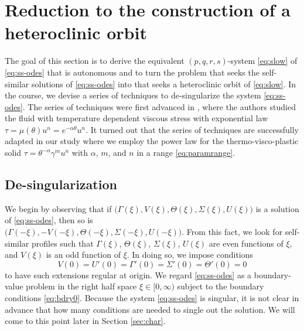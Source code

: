 \documentclass[a4paper,11pt]{article}
\theoremstyle{remark}
\begin{document}
\section{Reduction to the construction of a heteroclinic orbit} \label{sec:formulation}
The goal of this section is to derive the equivalent $(p,q,r,s)$-system \eqref{eq:slow} of \eqref{eq:ss-odes} that is autonomous and to turn the problem that seeks the self-similar solutions of \eqref{eq:ss-odes} into that seeks a heteroclinic orbit of \eqref{eq:slow}. In the course, we devise a series of techniques to de-singularize the system \eqref{eq:ss-odes}. The series of techniques were first advanced in \cite{KOT14}, where the authors studied the fluid with temperature dependent viscous stress with exponential law $ \tau = \mu(\theta)u^n = e^{-\alpha\theta} u^n.$
It turned out that the series of techniques are successfully adapted in our study where we employ the power law for the thermo-visco-plastic solid %
$ \tau = \theta^{-\alpha}\gamma^{m}u^n$ with $\alpha$, $m$, and $n$ in a range \eqref{eq:paramrange}.%

\subsection{De-singularization}
We begin by observing that if $\big(\Gamma(\xi), V(\xi), \Theta(\xi), \Sigma(\xi), U(\xi)\big)$ is a solution of \eqref{eq:ss-odes}, then so is \\$\big(\Gamma(-\xi), -V(-\xi), \Theta(-\xi), \Sigma(-\xi), U(-\xi)\big)$. From this fact, we look for self-similar profiles such that $\Gamma(\xi)$, $\Theta(\xi)$, $\Sigma(\xi)$, $U(\xi)$ are even functions of $\xi$, and $V(\xi)$ is an odd function of $\xi$. In doing so, we impose conditions
\begin{equation}
 V(0)=U'(0)=\Gamma'(0)=\Sigma'(0)=\Theta'(0)=0 \label{eq:bdry0}
\end{equation}
to have such extensions regular at origin. We regard \eqref{eq:ss-odes} as a boundary-value problem in the right half space $\xi \in [0,\infty)$ subject to the boundary conditions \eqref{eq:bdry0}. Because the system \eqref{eq:ss-odes} is singular, it is not clear in advance that how many conditions are needed to single out the solution. We will come to this point later in Section \ref{sec:char}.%
\end{document}
